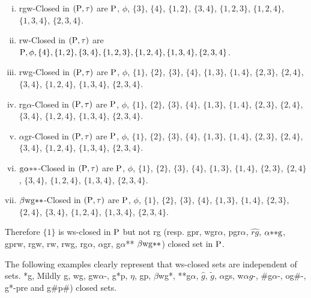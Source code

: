 \begin{exm}
\begin{enumerate}[(i)]
\item rgw-Closed in $(\mathrm{P}, \tau)$ are $\mathrm{P}$, $\phi$, $\{3\}$, $\{4\}$, $\{1, 2\}$, $\{3, 4\}$, $\{1, 2, 3\}$, $\{1, 2, 4\}$, $\{1, 3, 4\}$, $\{2, 3, 4\}$.

\item rw-Closed in $(\mathrm{P}, \tau)$ are $\mathrm{P}, \phi,\{4\},\{1, 2\},\{3, 4\},\{1, 2, 3\},\{1, 2, 4\},\{1, 3, 4\},\{2, 3, 4\}$.

\item rwg-Closed in $(\mathrm{P}, \tau)$ are $\mathrm{P}$, $ \phi$, $\{1\}$, $\{2\}$, $\{3\}$, $\{4\}$, $\{1,  3\}$, $\{1, 4\}$, $\{2, 3\}$, $\{2, 4\}$, $\{3, 4\}$, $\{1, 2, 4\}$, $\{1, 3, 4\}$, $\{2, 3, 4\}$.

\item rg$\alpha$-Closed in $(\mathrm{P}, \tau)$ are $\mathrm{P}$, $ \phi$, $\{1\}$, $\{2\}$, $\{3\}$, $\{4\}$, $\{1, 3\}$, $\{1, 4\}$, $\{2, 3\}$, $\{2, 4\}$, $\{3, 4\}$, $ \{1, 2, 4\}$, $ \{1, 3, 4\}$, $\{2, 3, 4\}$.

\item $\alpha$gr-Closed in $(\mathrm{P}, \tau)$ are $\mathrm{P}$, $ \phi$, $\{1\}$, $\{2\}$, $\{3\}$, $\{4\}$, $\{1, 3\}$, $\{1, 4\}$, $\{2, 3\}$, $\{2, 4\}$, $\{3, 4\}$, $ \{1, 2, 4\}$, $ \{1, 3, 4\}$, $\{2, 3, 4\}$.

\item $\mathrm{g}\alpha {*}{*}$-Closed in $(\mathrm{P}, \tau)$ are $\mathrm{P}$, $ \phi$, $\{1\}$, $\{2\}$, $\{3\}$, $\{4\}$, $\{1, 3\}$, $\{1, 4\}$, $\{2, 3\}$, $\{2, 4\}$, $\{3, 4\}$, $ \{1, 2, 4\}$, $ \{1, 3, 4\}$, $\{2, 3, 4\}$.

\item $\beta \mathrm{wg}{*}{*}$-Closed in $(\mathrm{P}, \tau)$ are $\mathrm{P}$, $ \phi$, $\{1\}$, $\{2\}$, $\{3\}$, $\{4\}$, $\{1, 3\}$, $\{1, 4\}$, $\{2, 3\}$, $\{2, 4\}$, $\{3, 4\}$, $ \{1, 2, 4\}$, $ \{1, 3, 4\}$, $\{2, 3, 4\}$.
\end{enumerate}
\end{exm}

Therefore $\{1\}$ is ws-closed in $\mathrm{P}$ but not rg (resp. gpr, wgr$\alpha$, pgr$\alpha$, $\widehat{rg}$, $\alpha{*}{*}\mathrm{g}$, gprw, rgw, rw, rwg, rg$\alpha$, $\alpha$gr, g$\alpha${*}{*} $\beta \mathrm{wg}{*}{*}$) closed set in $\mathrm{P}$.

\begin{rem}\label{rem2.2.16}
The following examples clearly represent that ws-closed sets are independent of sets. *g, Mildly g, wg, gw$\alpha$-, g*p, $\eta$, gp, $\beta$wg*, {*}{*}g$\alpha$, $\hat{g}$, $\tilde{g}$, $\alpha$gs, w$\alpha\hat{g}$-, $\#$g$\alpha$-, og$\#$-, g*-pre and g\#p\#) closed sets.
\end{rem}

